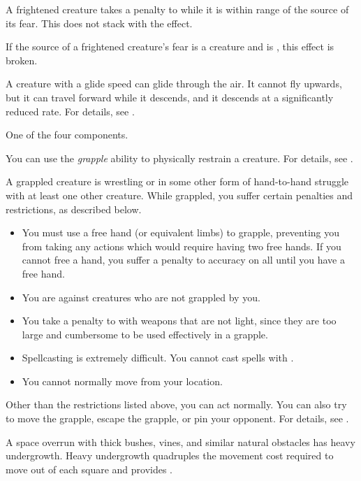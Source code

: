  A frightened creature takes a  penalty to  while it is within \rngmed range of the source of its fear.
This does not stack with the  effect.

If the source of a frightened creature's fear is a creature and is , this effect is broken.

 A creature with a glide speed can glide through the air.
It cannot fly upwards, but it can travel forward while it descends, and it descends at a significantly reduced rate.
For details, see .

 One of the four  components.

 You can use the \textit{grapple} ability to physically restrain a creature.
For details, see .

 A grappled creature is wrestling or in some other form of hand-to-hand struggle with at least one other creature.
While grappled, you suffer certain penalties and restrictions, as described below.
\begin{itemize}
    \item You must use a free hand (or equivalent limbs) to grapple, preventing you from taking any actions which would require having two free hands.
        If you cannot free a hand, you suffer a  penalty to accuracy on all  until you have a free hand.
    \item You are  against creatures who are not grappled by you.
    \item You take a  penalty to  with weapons that are not light, since they are too large and cumbersome to be used effectively in a grapple.
    \item Spellcasting is extremely difficult. You cannot cast spells with .
    \item You cannot normally move from your location. 
\end{itemize}

Other than the restrictions listed above, you can act normally. You can also try to move the grapple, escape the grapple, or pin your opponent. For details, see .

 A space overrun with thick bushes, vines, and similar natural obstacles has heavy undergrowth.
Heavy undergrowth quadruples the movement cost required to move out of each square and provides .

